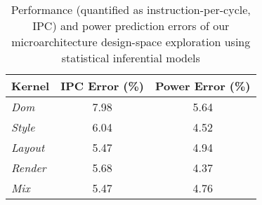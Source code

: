 
\begin{table}[t]
\large
\centering
\captionsetup{width=.75\columnwidth}
\caption{\small Performance (quantified as instruction-per-cycle, IPC) and power prediction errors of our microarchitecture design-space exploration using statistical inferential models}
\renewcommand*{\arraystretch}{1.4}
\renewcommand*{\tabcolsep}{18pt}
\resizebox{.75\columnwidth}{!}
{
	\begin{tabular}{l c c}
	\toprule[0.15em]
	\bigstrut\textbf{Kernel}	& \bigstrut\textbf{IPC Error (\%)} & \bigstrut\textbf{Power Error (\%)} \\
	\midrule[0.05em]
	\textit{Dom}		&	7.98	&	5.64	\\
	\textit{Style}		&	6.04	&	4.52	\\
	\textit{Layout}	&	5.47	&	4.94	\\
	\textit{Render}	&	5.68	&	4.37	\\
	\textit{Mix}		&	5.47	&	4.76	\\
	\bottomrule[0.15em]
	\end{tabular}
}
\label{tab:model}
\end{table}
